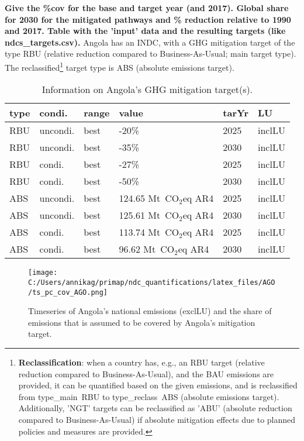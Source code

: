 \documentclass[12pt]{article}
\begin{document}
 \textbf{ 
 Give the \%cov for the base and target year (and 2017).
 Global share for 2030 for the mitigated pathways and \% reduction relative to 1990 and 2017.
 Table with the 'input' data and the resulting targets (like ndcs\_targets.csv).}
 Angola has an INDC, with a GHG mitigation target of the type RBU (relative reduction compared to Business-As-Usual; main target type).
 The reclassified\footnote{\textbf{Reclassification}: when a country has, e.g., an RBU target (relative reduction compared to Business-As-Usual), and the BAU emissions are provided, it can be quantified based on the given emissions, and is reclassified from type\_main~RBU to type\_reclass~ABS (absolute emissions target).
 Additionally, 'NGT' targets can be reclassified as 'ABU' (absolute reduction compared to Business-As-Usual) if absolute mitigation effects due to planned policies and measures are provided.}  target type is ABS (absolute emissions target).
 \begin{table}[htbp]
 \centering
 \caption{Information on Angola's GHG mitigation target(s).}
 \label{tab:mitiTars}
 \begin{tabular}{l l l l l l }
 \bfseries type & \bfseries condi. & \bfseries range & \bfseries value & \bfseries tarYr & \bfseries LU \tabularnewline \hline
 RBU & uncondi. & best & -20\% & 2025 & inclLU \tabularnewline 
 RBU & uncondi. & best & -35\% & 2030 & inclLU \tabularnewline 
 RBU & condi. & best & -27\% & 2025 & inclLU \tabularnewline 
 RBU & condi. & best & -50\% & 2030 & inclLU \tabularnewline 
 ABS & uncondi. & best & 124.65 Mt~CO$_2$eq AR4 & 2025 & inclLU \tabularnewline 
 ABS & uncondi. & best & 125.61 Mt~CO$_2$eq AR4 & 2030 & inclLU \tabularnewline 
 ABS & condi. & best & 113.74 Mt~CO$_2$eq AR4 & 2025 & inclLU \tabularnewline 
 ABS & condi. & best & 96.62 Mt~CO$_2$eq AR4 & 2030 & inclLU \tabularnewline 
 \end{tabular}
 \end{table}
 \begin{figure}[htbp]
 \centering
 \texttt{[image: C:/Users/annikag/primap/ndc\_quantifications/latex\_files/AGO/ts\_pc\_cov\_AGO.png]}
 \caption{Timeseries of Angola's national emissions (exclLU) and the share of emissions that is assumed to be covered by Angola's mitigation target.}
 \label{fig:tsPcCov}
 \end{figure}
\end{document}
